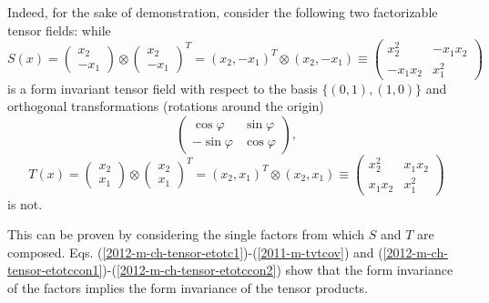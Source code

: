 {
\color{blue}
\bexample
Indeed,  for the sake of demonstration, consider the following two factorizable tensor fields:
while
\begin{equation}
{S}(x)=
\begin{pmatrix}
  {  x}_2  \\
- {  x}_1
\end{pmatrix}
\otimes
\begin{pmatrix}
   {  x}_2  \\
 - {  x}_1
\end{pmatrix}^T
=
\left(    {  x}_2 ,- {  x}_1  \right)^T
\otimes
\left(    {  x}_2 ,- {  x}_1  \right)
\equiv
\begin{pmatrix}
   {  x}_2^2          & -{ x}_1{x}_2  \\
 - {  x}_1{  x}_2     & { x}_1^2
\end{pmatrix}
\label{2012-m-ch-tensor-etotccon1factorized}
\end{equation}
is a form invariant tensor field with respect to the basis $\{(0,1),(1,0)\}$
and orthogonal transformations (rotations around the origin)
\begin{equation}
\begin{pmatrix}
  \cos \varphi & \sin \varphi  \\
 -\sin \varphi & \cos \varphi
\end{pmatrix}
,
\end{equation}
\begin{equation}
{ T}(x)=
\begin{pmatrix}
{  x}_2  \\
{  x}_1
\end{pmatrix}
\otimes
\begin{pmatrix}
{  x}_2  \\
{  x}_1 \end{pmatrix}^T
=
\left(    {  x}_2 ,  {  x}_1  \right)^T
\otimes
\left(    {  x}_2 ,  {  x}_1  \right)
\equiv
\begin{pmatrix}
{  x}_2^2 & { x}_1{  x}_2  \\
{  x}_1{  x}_2          & { x}_1^2
\end{pmatrix}
\end{equation}
is not.

This can be proven by considering the single factors from which $S$ and $T$ are composed.
Eqs. (\ref{2012-m-ch-tensor-etotc1})-(\ref{2011-m-tvtcov})
and
(\ref{2012-m-ch-tensor-etotccon1})-(\ref{2012-m-ch-tensor-etotccon2})
show that the form
invariance of the factors implies the form invariance of the tensor products.

}
